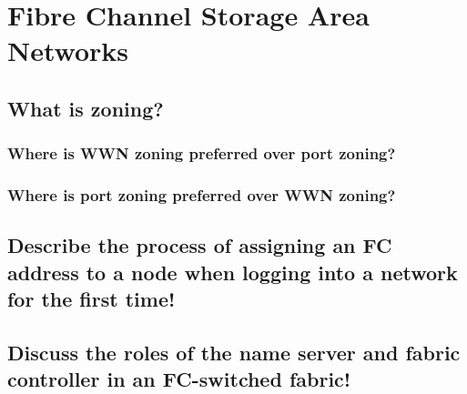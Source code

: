 \section{Fibre Channel Storage Area Networks} %
\label{sec:fibre_channel_storage_area_networks}

\subsection{What is zoning?} %
\label{sub:what_is_zoning}

\subsubsection{Where is WWN zoning preferred over port zoning?} %
\label{ssub:where_is_wwn_zoning_preferred_over_port_zoning}


\subsubsection{Where is port zoning preferred over WWN zoning?} %
\label{ssub:where_is_port_zoning_preferred_over_wwn_zoning}



\subsection{Describe the process of assigning an FC address to a node when logging into a network for the first time!} %
\label{sub:describe_the_process_of_assigning_an_fc_address_to_a_node_when_logging_into_a_network_for_the_first_time}


\subsection{Discuss the roles of the name server and fabric controller in an FC-switched fabric!} %
\label{sub:discuss_the_roles_of_the_name_server_and_fabric_controller_in_an_fc_switched_fabric}


